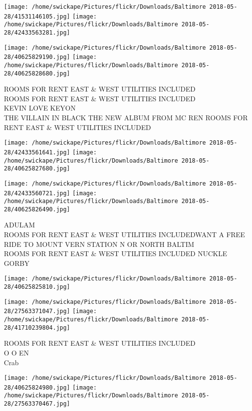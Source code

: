 \documentclass[10pt,letterpaper]{article}
\begin{document}
\texttt{[image: /home/swickape/Pictures/flickr/Downloads/Baltimore 2018-05-28/41531146105.jpg]}
\texttt{[image: /home/swickape/Pictures/flickr/Downloads/Baltimore 2018-05-28/42433563281.jpg]}

\texttt{[image: /home/swickape/Pictures/flickr/Downloads/Baltimore 2018-05-28/40625829190.jpg]}
\texttt{[image: /home/swickape/Pictures/flickr/Downloads/Baltimore 2018-05-28/40625828680.jpg]}

ROOMS FOR RENT EAST \& WEST UTILITIES INCLUDED\\
ROOMS FOR RENT EAST \& WEST UTILITIES INCLUDED\\
KEVIN LOVE KEYON\\
THE VILLAIN IN BLACK THE NEW ALBUM FROM MC REN ROOMS FOR RENT EAST \& WEST UTILITIES INCLUDED\\
\pagebreak

\texttt{[image: /home/swickape/Pictures/flickr/Downloads/Baltimore 2018-05-28/42433561641.jpg]}
\texttt{[image: /home/swickape/Pictures/flickr/Downloads/Baltimore 2018-05-28/40625827680.jpg]}

\texttt{[image: /home/swickape/Pictures/flickr/Downloads/Baltimore 2018-05-28/42433560721.jpg]}
\texttt{[image: /home/swickape/Pictures/flickr/Downloads/Baltimore 2018-05-28/40625826490.jpg]}

ADULAM\\
ROOMS FOR RENT EAST \& WEST UTILITIES INCLUDEDWANT A FREE RIDE TO MOUNT VERN STATION N OR NORTH BALTIM\\
ROOMS FOR RENT EAST \& WEST UTILITIES INCLUDED NUCKLE\\
GORBY\\
\pagebreak

\texttt{[image: /home/swickape/Pictures/flickr/Downloads/Baltimore 2018-05-28/40625825810.jpg]}

\vspace{0.25in}
\texttt{[image: /home/swickape/Pictures/flickr/Downloads/Baltimore 2018-05-28/27563371047.jpg]}
\texttt{[image: /home/swickape/Pictures/flickr/Downloads/Baltimore 2018-05-28/41710239804.jpg]}

ROOMS FOR RENT EAST \& WEST UTILITIES INCLUDED\\
O O EN\\
Crab\\
\pagebreak

\texttt{[image: /home/swickape/Pictures/flickr/Downloads/Baltimore 2018-05-28/40625824980.jpg]}
\texttt{[image: /home/swickape/Pictures/flickr/Downloads/Baltimore 2018-05-28/27563370467.jpg]}
\end{document}
